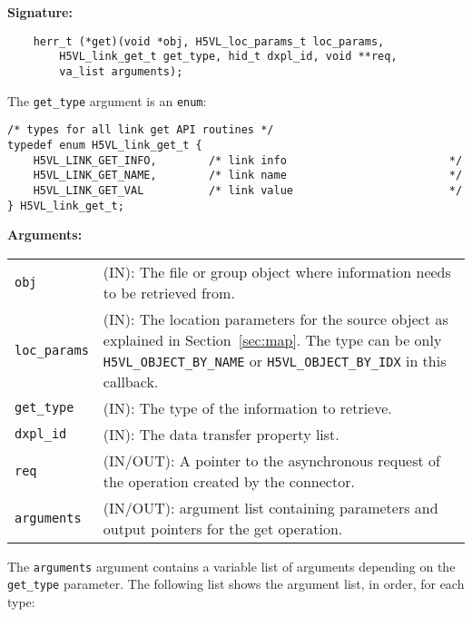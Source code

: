 \begin{mdframed}[style=bgbox]
\textbf{Signature:}
\begin{lstlisting}
    herr_t (*get)(void *obj, H5VL_loc_params_t loc_params, 
        H5VL_link_get_t get_type, hid_t dxpl_id, void **req, 
        va_list arguments);
\end{lstlisting}

The \texttt{get\_type} argument is an \texttt{enum}:
\begin{lstlisting}
/* types for all link get API routines */
typedef enum H5VL_link_get_t {                                                   
    H5VL_LINK_GET_INFO,        /* link info                         */           
    H5VL_LINK_GET_NAME,        /* link name                         */           
    H5VL_LINK_GET_VAL          /* link value                        */           
} H5VL_link_get_t; 
\end{lstlisting}

\textbf{Arguments:}\\
\begin{tabular}{l p{13.5cm}}
  \texttt{obj} & (IN): The file or group object where information needs to be
  retrieved from.\\
  \texttt{loc\_params} & (IN): The location parameters for the source
  object as explained in Section~\ref{sec:map}. The type can be only \texttt{H5VL\_OBJECT\_BY\_NAME} or \texttt{H5VL\_OBJECT\_BY\_IDX} in this
  callback.\\ 
  \texttt{get\_type} & (IN): The type of the information to retrieve.\\
  \texttt{dxpl\_id} & (IN): The data transfer property list.\\
  \texttt{req} & (IN/OUT): A pointer to the asynchronous request of the
  operation created by the connector.\\
  \texttt{arguments} & (IN/OUT): argument list containing parameters and
  output pointers for the get operation. \\
\end{tabular}
\end{mdframed}

The \texttt{arguments} argument contains a variable list of arguments
depending on the \texttt{get\_type} parameter. The following list shows
the argument list, in order, for each type:

